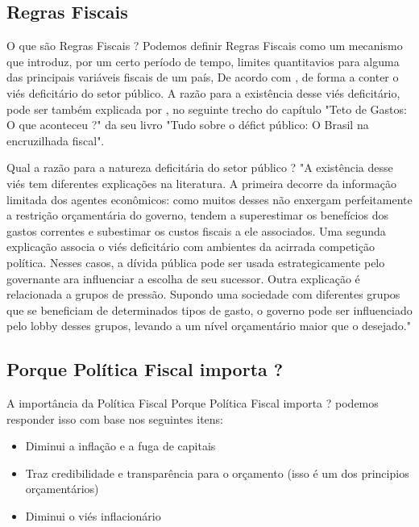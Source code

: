 \documentclass[xcolor=dvipsnames]{beamer}
\begin{document}
\subsection{Regras Fiscais}
\begin{frame}{O que são Regras Fiscais ?}
Podemos definir Regras Fiscais como um mecanismo que introduz, por um certo período de tempo, limites quantitavios para alguma das principais variáveis fiscais de um país, 
De acordo com \cite{Giambiagi}, de forma a conter o viés deficitário do setor público. 
A razão para a existência desse viés deficitário, pode ser também explicada por \cite{Giambiagi}, no seguinte trecho do capítulo "Teto de Gastos: O que aconteceu ?" da seu livro "Tudo sobre o défict público: O Brasil na encruzilhada fiscal".
    
\end{frame}
\begin{frame}{Qual a razão para a natureza deficitária do setor público ?}
"A existência desse viés tem diferentes explicações na literatura. A primeira decorre da informação limitada dos agentes econômicos: como muitos desses não enxergam perfeitamente a restrição orçamentária do governo, tendem a superestimar os benefícios dos gastos correntes e subestimar os custos fiscais a ele associados. Uma segunda explicação associa o viés deficitário com ambientes da acirrada competição política. Nesses casos, a dívida pública pode ser usada estrategicamente pelo governante ara influenciar a escolha de seu sucessor. Outra explicação é relacionada a grupos de pressão. Supondo uma sociedade com diferentes grupos que se beneficiam de determinados tipos de gasto, o governo pode ser influenciado pelo lobby desses grupos, levando a um nível orçamentário maior que o desejado." \cite{Giambiagi}
    
\end{frame}
\subsection{Porque Política Fiscal importa ?}
\begin{frame}{A importância da Política Fiscal}
Porque Política Fiscal importa ? podemos responder isso com base nos seguintes itens:
\begin{itemize}
    \item Diminui a inflação e a fuga de capitais
    \item Traz credibilidade e transparência para o orçamento (isso é um dos principios orçamentários) 
    \item Diminui o viés inflacionário
\end{itemize}
    
\end{frame}
\end{document}
